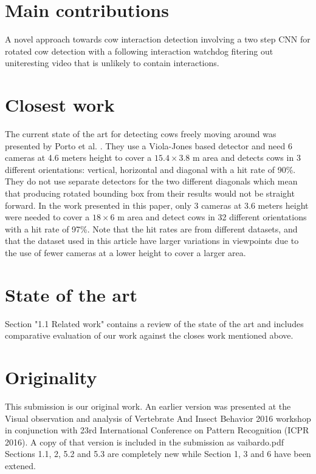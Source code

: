 \documentclass[10pt,a4paper]{article}
\begin{document}
\section{Main contributions}
A novel approach towards cow interaction detection involving a two step CNN for rotated cow detection with a following interaction watchdog fitering out uniteresting video that is unlikely to contain interactions.

\section{Closest work}
The current state of the art for detecting cows freely moving around was presented by Porto et al. \cite{porto2015automatic}. They use a Viola-Jones based detector and need 
6 cameras at 4.6 meters height to cover a $15.4 \times 3.8$ m area and detects cows in 3 different orientations: vertical, horizontal and diagonal with a hit rate of 90\%. They do not use separate detectors for the two different diagonals which mean that producing rotated bounding box from their results would not be straight forward. In the work presented in this paper, only 3 cameras at 3.6 meters height were needed to cover a $18 \times 6$ m area and detect cows in 32 different orientations with a hit rate of 97\%. Note that the hit rates are from different datasets, and that the dataset used in this article have larger variations in viewpoints due to the use of fewer cameras at a lower height to cover a larger area.

\section{State of the art}
Section "1.1 Related work" contains a review of the state of the art and includes comparative evaluation of our work against the closes work mentioned above.

\section{Originality}
This submission is our original work. An earlier version was presented at the Visual observation and analysis of Vertebrate And Insect Behavior 2016 workshop  in conjunction with 23rd International Conference on Pattern Recognition (ICPR 2016). A copy of that version is included in the submission as vaibardo.pdf Sections 1.1, 2, 5.2 and 5.3 are completely new while Section 1, 3 and 6 have been extened.


{\parindent0pt
\parskip8pt

}
\end{document}
